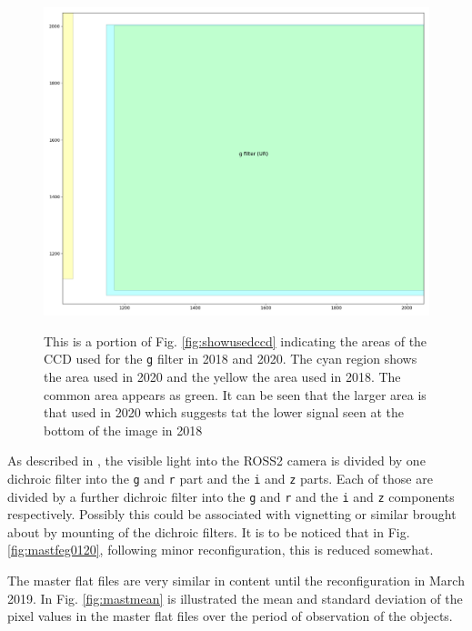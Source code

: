 \begin{figure}[!htbp]
\begin{center}
\includegraphics[scale=0.2]{images/gfiltareas1820.png}
\end{center}   
\caption{This is a portion of Fig. \ref{fig:showusedccd} indicating the areas
of the CCD used for the \texttt{g} filter in 2018 and 2020. The cyan region
shows the area used in 2020 and the yellow the area used in 2018. The common
area appears as green. It can be seen that the larger area is that used in 2020
which suggests tat the lower signal seen at the bottom of the image in 2018}
\protect\label{fig:gfiltareas1820}
\end{figure}

As described in \citet{molinari14}, the visible light into the ROSS2 camera is
divided by one dichroic filter into the \texttt{g} and \texttt{r} part and
the \texttt{i} and \texttt{z} parts. Each of those are divided by a further
dichroic filter into the \texttt{g} and \texttt{r} and the \texttt{i} and
\texttt{z} components respectively. Possibly this could be associated with
vignetting or similar brought about by mounting of the dichroic filters. It is
to be noticed that in Fig. \ref{fig:mastfeg0120}, following minor reconfiguration,
this is reduced somewhat.

The master flat files are very similar in content until the reconfiguration in
March 2019. In Fig. \ref{fig:mastmean} is illustrated the mean and standard
deviation of the pixel values in the master flat files over the period of
observation of the {\rdwarf} objects.

